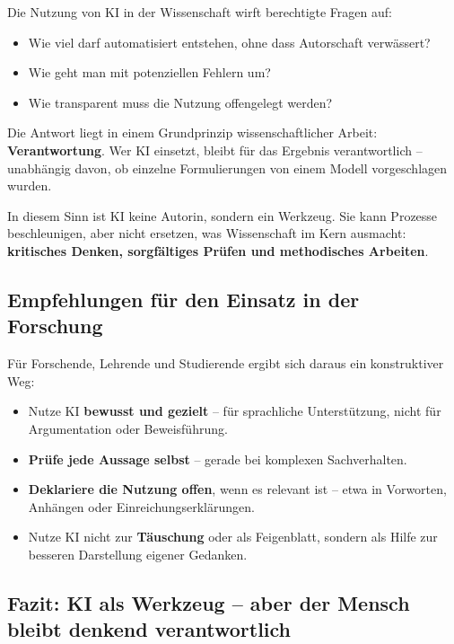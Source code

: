 Die Nutzung von KI in der Wissenschaft wirft berechtigte Fragen auf:

\begin{itemize}
	\item Wie viel darf automatisiert entstehen, ohne dass Autorschaft verwässert?
	\item Wie geht man mit potenziellen Fehlern um?
	\item Wie transparent muss die Nutzung offengelegt werden?
\end{itemize}

Die Antwort liegt in einem Grundprinzip wissenschaftlicher Arbeit: \textbf{Verantwortung}. Wer KI einsetzt, bleibt für das Ergebnis verantwortlich -- unabhängig davon, ob einzelne Formulierungen von einem Modell vorgeschlagen wurden.

In diesem Sinn ist KI keine Autorin, sondern ein Werkzeug. Sie kann Prozesse beschleunigen, aber nicht ersetzen, was Wissenschaft im Kern ausmacht: \textbf{kritisches Denken, sorgfältiges Prüfen und methodisches Arbeiten}.

\subsection*{Empfehlungen für den Einsatz in der Forschung}

Für Forschende, Lehrende und Studierende ergibt sich daraus ein konstruktiver Weg:

\begin{itemize}
	\item Nutze KI \textbf{bewusst und gezielt} -- für sprachliche Unterstützung, nicht für Argumentation oder Beweisführung.
	\item \textbf{Prüfe jede Aussage selbst} -- gerade bei komplexen Sachverhalten.
	\item \textbf{Deklariere die Nutzung offen}, wenn es relevant ist -- etwa in Vorworten, Anhängen oder Einreichungserklärungen.
	\item Nutze KI nicht zur \textbf{Täuschung} oder als Feigenblatt, sondern als Hilfe zur besseren Darstellung eigener Gedanken.
\end{itemize}

\subsection*{Fazit: KI als Werkzeug -- aber der Mensch bleibt denkend verantwortlich}

